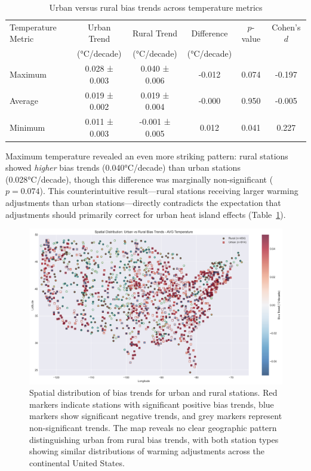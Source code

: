 \documentclass[11pt, a4paper]{article}
\begin{document}
\begin{table}[htbp]
\centering
\caption{Urban versus rural bias trends across temperature metrics}
\label{tab:urban_rural}
\begin{tabular}{lccccc}
\hline
Temperature Metric & Urban Trend & Rural Trend & Difference & $p$-value & Cohen's $d$ \\
& (°C/decade) & (°C/decade) & (°C/decade) & & \\
\hline
Maximum & 0.028 ± 0.003 & 0.040 ± 0.006 & -0.012 & 0.074 & -0.197 \\
Average & 0.019 ± 0.002 & 0.019 ± 0.004 & -0.000 & 0.950 & -0.005 \\
Minimum & 0.011 ± 0.003 & -0.001 ± 0.005 & 0.012 & 0.041 & 0.227 \\
\hline
\end{tabular}
\end{table}

Maximum temperature revealed an even more striking pattern: rural stations showed \textit{higher} bias trends (0.040°C/decade) than urban stations (0.028°C/decade), though this difference was marginally non-significant ($p = 0.074$). This counterintuitive result—rural stations receiving larger warming adjustments than urban stations—directly contradicts the expectation that adjustments should primarily correct for urban heat island effects (Table~\ref{tab:urban_rural}).

\begin{figure}[htbp]
    \centering
    \includegraphics[width=1.0\textwidth]{figures/urban_rural_spatial_avg.png}
    \caption{Spatial distribution of bias trends for urban and rural stations. Red markers indicate stations with significant positive bias trends, blue markers show significant negative trends, and grey markers represent non-significant trends. The map reveals no clear geographic pattern distinguishing urban from rural bias trends, with both station types showing similar distributions of warming adjustments across the continental United States.}
    \label{fig:spatial}
\end{figure}
\end{document}
